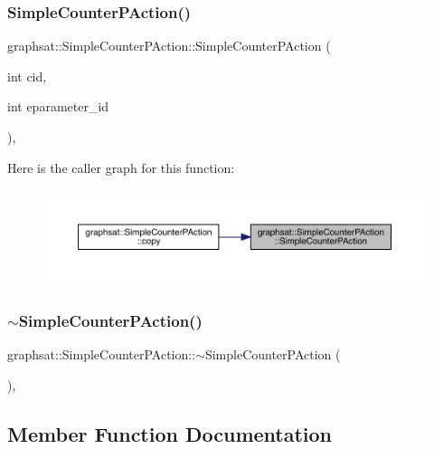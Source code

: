 \subsubsection{\texorpdfstring{SimpleCounterPAction()}{SimpleCounterPAction()}}
{\footnotesize\ttfamily graphsat\+::\+Simple\+Counter\+P\+Action\+::\+Simple\+Counter\+P\+Action (\begin{DoxyParamCaption}\item[{int}]{cid,  }\item[{int}]{eparameter\+\_\+id }\end{DoxyParamCaption})\hspace{0.3cm}{\ttfamily [inline]}, {\ttfamily [private]}}

Here is the caller graph for this function\+:
\nopagebreak
\begin{figure}[H]
\begin{center}
\leavevmode
\includegraphics[width=350pt]{classgraphsat_1_1_simple_counter_p_action_ab42e2533bea10ef444fe74b71e838b15_icgraph}
\end{center}
\end{figure}
\mbox{\label{classgraphsat_1_1_simple_counter_p_action_ae503fa1d40ca5fcb38a69b7dfd0a93dd}} 
\subsubsection{\texorpdfstring{$\sim$SimpleCounterPAction()}{~SimpleCounterPAction()}}
{\footnotesize\ttfamily graphsat\+::\+Simple\+Counter\+P\+Action\+::$\sim$\+Simple\+Counter\+P\+Action (\begin{DoxyParamCaption}{ }\end{DoxyParamCaption})\hspace{0.3cm}{\ttfamily [inline]}, {\ttfamily [private]}}



\subsection{Member Function Documentation}
\mbox{\label{classgraphsat_1_1_simple_counter_p_action_ad7a689c0bc048013e29ea4a9c77e7779}} 
